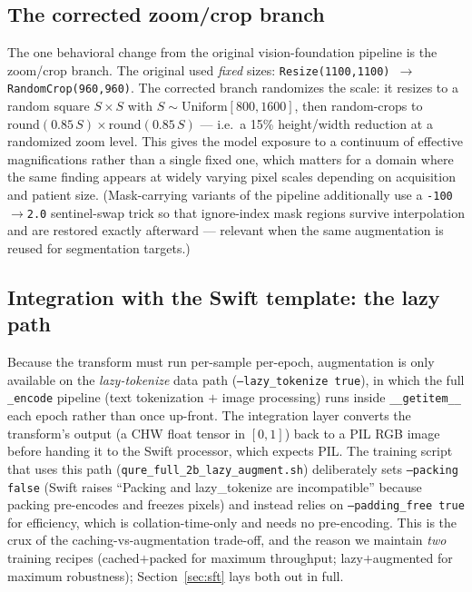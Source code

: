 \documentclass[11pt,a4paper]{article}
\begin{document}
\subsection{The corrected zoom/crop branch}
The one behavioral change from the original vision-foundation pipeline is the zoom/crop branch. The original used \emph{fixed} sizes: \texttt{Resize(1100,1100) $\rightarrow$ RandomCrop(960,960)}. The corrected branch randomizes the scale: it resizes to a random square $S\times S$ with $S \sim \mathrm{Uniform}[800, 1600]$, then random-crops to $\mathrm{round}(0.85\,S)\times\mathrm{round}(0.85\,S)$ --- i.e.\ a 15\% height/width reduction at a randomized zoom level. This gives the model exposure to a continuum of effective magnifications rather than a single fixed one, which matters for a domain where the same finding appears at widely varying pixel scales depending on acquisition and patient size. (Mask-carrying variants of the pipeline additionally use a \texttt{-100}$\rightarrow$\texttt{2.0} sentinel-swap trick so that ignore-index mask regions survive interpolation and are restored exactly afterward --- relevant when the same augmentation is reused for segmentation targets.)

\subsection{Integration with the Swift template: the lazy path}
Because the transform must run per-sample per-epoch, augmentation is only available on the \emph{lazy-tokenize} data path (\texttt{--lazy\_tokenize true}), in which the full \texttt{\_encode} pipeline (text tokenization $+$ image processing) runs inside \texttt{\_\_getitem\_\_} each epoch rather than once up-front. The integration layer converts the transform's output (a CHW float tensor in $[0,1]$) back to a PIL RGB image before handing it to the Swift processor, which expects PIL. The training script that uses this path (\texttt{qure\_full\_2b\_lazy\_augment.sh}) deliberately sets \texttt{--packing false} (Swift raises ``Packing and lazy\_tokenize are incompatible'' because packing pre-encodes and freezes pixels) and instead relies on \texttt{--padding\_free true} for efficiency, which is collation-time-only and needs no pre-encoding. This is the crux of the caching-vs-augmentation trade-off, and the reason we maintain \emph{two} training recipes (cached$+$packed for maximum throughput; lazy$+$augmented for maximum robustness); Section~\ref{sec:sft} lays both out in full.

\end{document}

